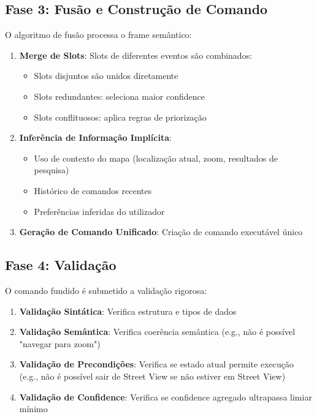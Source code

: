 \subsection{Fase 3: Fusão e Construção de Comando}

O algoritmo de fusão processa o frame semântico:

\begin{enumerate}
    \item \textbf{Merge de Slots}: Slots de diferentes eventos são combinados:
    \begin{itemize}
        \item Slots disjuntos são unidos diretamente
        \item Slots redundantes: seleciona maior confidence
        \item Slots conflituosos: aplica regras de priorização
    \end{itemize}

    \item \textbf{Inferência de Informação Implícita}:
    \begin{itemize}
        \item Uso de contexto do mapa (localização atual, zoom, resultados de pesquisa)
        \item Histórico de comandos recentes
        \item Preferências inferidas do utilizador
    \end{itemize}

    \item \textbf{Geração de Comando Unificado}: Criação de comando executável único
\end{enumerate}

\subsection{Fase 4: Validação}

O comando fundido é submetido a validação rigorosa:

\begin{enumerate}
    \item \textbf{Validação Sintática}: Verifica estrutura e tipos de dados
    \item \textbf{Validação Semântica}: Verifica coerência semântica (e.g., não é possível "navegar para zoom")
    \item \textbf{Validação de Precondições}: Verifica se estado atual permite execução (e.g., não é possível sair de Street View se não estiver em Street View)
    \item \textbf{Validação de Confidence}: Verifica se confidence agregado ultrapassa limiar mínimo
\end{enumerate}

